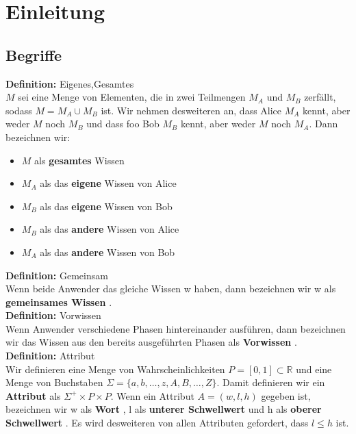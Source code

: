 \documentclass{article}
\newenvironment{definition}
    [1]
    {
        {\bf Definition:} #1\\
    }
    {}
\newcommand{\defined}
    [1]
    {
        {\bf #1}
    }
\begin{document}
\listoftodos
\pagebreak
\tableofcontents
\pagebreak
\section{Einleitung}
\subsection{Begriffe}
\begin{definition}{Eigenes,Gesamtes}
\(M\) sei eine Menge von Elementen, die in zwei Teilmengen \(M_A\)
und \(M_B\) zerf\"allt, sodass \(M = M_A \cup M_B\) ist. Wir nehmen
desweiteren an, dass Alice \(M_A\) kennt, aber weder \(M\) noch \(M_B\)
und dass foo Bob \(M_B\) kennt, aber weder \(M\) noch \(M_A\). Dann bezeichnen
wir:
\begin{itemize}
\item \(M\) als \defined{gesamtes} Wissen
\item \(M_A\) als das \defined{eigene} Wissen von Alice
\item \(M_B\) als das \defined{eigene} Wissen von Bob
\item \(M_B\) als das \defined{andere} Wissen von Alice
\item \(M_A\) als das \defined{andere} Wissen von Bob
\end{itemize}
\end{definition}
\begin{definition}{Gemeinsam}
Wenn beide Anwender das gleiche Wissen w haben, dann bezeichnen wir w
als \defined{gemeinsames Wissen}. 
\end{definition}\\
\begin{definition}{Vorwissen}
Wenn Anwender verschiedene Phasen hintereinander ausf\"uhren, dann bezeichnen
wir das Wissen aus den bereits ausgef\"uhrten Phasen als \defined{Vorwissen}.
\end{definition}\\
\begin{definition}{Attribut}
Wir definieren eine Menge von Wahrscheinlichkeiten 
\(P = [0, 1] \subset \mathbb{R}\) und eine Menge von Buchstaben 
\(\Sigma = \{a, b, \dots, z, A, B, \dots, Z\}\).
Damit definieren wir ein \defined{Attribut} als 
\(\Sigma^+ \times P \times P\). Wenn ein Attribut \(A = (w, l, h)\) gegeben ist,
bezeichnen wir w als \defined{Wort}, l als \defined{unterer Schwellwert} und h
als \defined{oberer Schwellwert}. Es wird desweiteren von allen Attributen
gefordert, dass \(l \leq h\) ist.
\end{definition}\\
\end{document}
